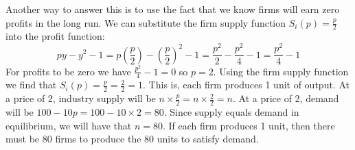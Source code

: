 \documentclass[12pt]{article}
\newcounter{question}[section]
\newenvironment{subquestions}{
  \begin{enumerate}[label=(\roman*)]}{\end{enumerate}}
\begin{document}
\begin{subquestions}
{      Another way to answer this is to use the fact that we know firms will earn zero profits in the long run. We can substitute the firm supply function $S_i\left( p \right)=\frac{p}{2}$ into the profit function:
      \begin{equation*}
        py - y^2 - 1 = p\left( \frac{p}{2} \right)-\left( \frac{p}{2} \right)^2 - 1=\frac{p^2}{2}-\frac{p^2}{4}-1=\frac{p^2}{4}-1
      \end{equation*}
      For profits to be zero we have $\frac{p^2}{4}-1=0$ so $p=2$. Using the firm supply function we find that $S_i\left( p \right)=\frac{p}{2}=\frac{2}{2}=1$. This is, each firm produces 1 unit of output. At a price of 2, industry supply will be $n\times\frac{p}{2}=n\times\frac{2}{2}=n$. At a price of 2, demand will be $100-10p=100-10\times 2 = 80$. Since supply equals demand in equilibrium, we will have that $n=80$. If each firm produces 1 unit, then there must be 80 firms to produce the 80 units to satisfy demand.
    }
\end{subquestions}
\end{document}

